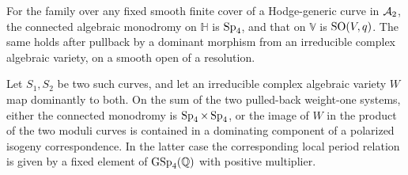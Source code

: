 \begin{proposition}\label{prop:monodromy}
For the family over any fixed smooth finite cover of a Hodge-generic
curve in $\mathcal A_2$, the connected algebraic monodromy on $\mathbb H$ is
$\operatorname{Sp}_4$, and that on $\mathbb V$ is $\operatorname{SO}(V,q)$.  The same holds after
pullback by a dominant morphism from an irreducible complex algebraic
variety, on a smooth open of a resolution.

Let $S_1,S_2$ be two such curves, and let an irreducible complex algebraic
variety $W$ map dominantly to both.  On the sum of the two pulled-back
weight-one systems, either the connected monodromy is
$\operatorname{Sp}_4\times\operatorname{Sp}_4$, or the image of $W$ in the product of the two moduli
curves is contained in a dominating component of a polarized isogeny
correspondence.  In the latter case the corresponding local period
relation is given by a fixed element of $\operatorname{GSp}_4(\mathbb Q)$ with positive
multiplier.
\end{proposition}

